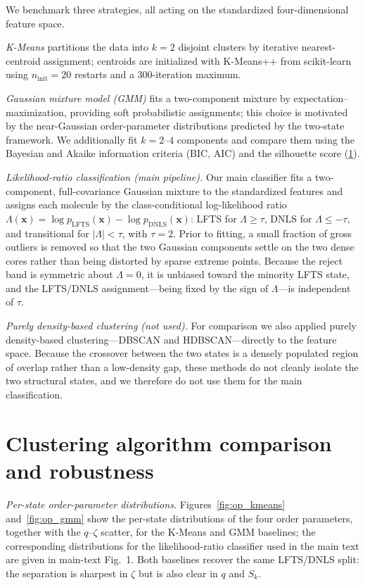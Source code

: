 \documentclass[aps,amsmath,amssymb,onecolumn,superscriptaddress,nofootinbib]{revtex4-2}
\begin{document}
We benchmark three strategies, all acting on the standardized four-dimensional
feature space.

\emph{K-Means} partitions the data into $k=2$
disjoint clusters by iterative nearest-centroid assignment; centroids are
initialized with K-Means++ from scikit-learn using
$n_{\mathrm{init}}=20$ restarts and a $300$-iteration maximum.

\emph{Gaussian mixture model (GMM)} fits a two-component
mixture by expectation--maximization, providing soft probabilistic assignments;
this choice is motivated by the near-Gaussian order-parameter distributions
predicted by the two-state framework. We additionally fit
$k=2$--$4$ components and compare them using the Bayesian and Akaike information
criteria (BIC, AIC) and the silhouette score (\ref{sn:robustness}).

\emph{Likelihood-ratio classification (main pipeline).} Our main classifier
fits a two-component, full-covariance Gaussian mixture to the standardized
features and assigns each molecule by the class-conditional log-likelihood ratio
$\Lambda(\mathbf{x})=\log p_{\mathrm{LFTS}}(\mathbf{x})-\log p_{\mathrm{DNLS}}(\mathbf{x})$:
LFTS for $\Lambda\geq\tau$, DNLS for $\Lambda\leq-\tau$, and transitional for
$|\Lambda|<\tau$, with $\tau=2$. Prior to fitting, a small fraction of gross
outliers is removed so that the two Gaussian components settle on the two dense
cores rather than being distorted by sparse extreme points. Because the reject band is
symmetric about $\Lambda=0$, it is unbiased toward the minority LFTS state, and
the LFTS/DNLS assignment---being fixed by the sign of $\Lambda$---is independent
of $\tau$.

\emph{Purely density-based clustering (not used).} For comparison we also
applied purely density-based clustering---DBSCAN and HDBSCAN---directly to the
feature space. Because the crossover between the two states is a densely
populated region of overlap rather than a low-density gap, these methods do not
cleanly isolate the two structural states, and we therefore do not use them for
the main classification.

\section{Clustering algorithm comparison and robustness}
\label{sn:robustness}

\emph{Per-state order-parameter distributions.}
Figures~\ref{fig:op_kmeans} and~\ref{fig:op_gmm} show the per-state
distributions of the four order parameters, together with the $q$--$\zeta$
scatter, for the K-Means and GMM baselines; the corresponding distributions for
the likelihood-ratio classifier used in the main text are given in main-text
Fig.~1. Both baselines recover the same LFTS/DNLS split: the separation is
sharpest in $\zeta$ but is also clear in $q$ and $S_k$.
\end{document}
